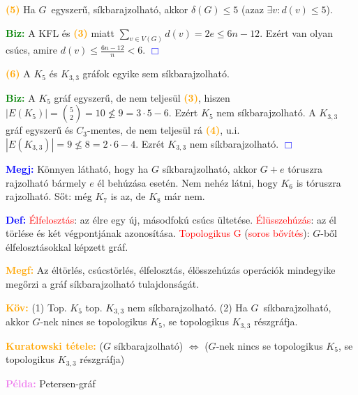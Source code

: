 \documentclass[../../szobeli.tex]{subfiles}
\begin{document}
\begin{itemize}
        \textcolor{orange}{\textbf{(5)}} Ha $G$ egyszerű, síkbarajzolható, akkor $\delta(G) \leq 5$ (azaz $\exists v : d(v) \leq 5$).

        \textcolor{green}{\textbf{Biz:}} A KFL és \textcolor{orange}{\textbf{(3)}} miatt $\sum_{v\in V(G)}d(v) = 2e \leq 6n - 12$. Ezért van olyan csúcs, amire $d(v) \leq \frac{6n-12}{n} < 6$. \textcolor{blue}{$\Box$}

        \textcolor{orange}{\textbf{(6)}} A $K_5$ és $K_{3,3}$ gráfok egyike sem síkbarajzolható.

        \textcolor{green}{\textbf{Biz:}} A $K_5$ gráf egyszerű, de nem teljesül \textcolor{orange}{\textbf{(3)}}, hiszen $|E(K_5)| = \binom{5}{2} = 10 \nleq 9 = 3 \cdot 5 - 6$. Ezért $K_5$ nem síkbarajzolható. A $K_{3,3}$ gráf egyszerű és $C_3$-mentes, de nem teljesül rá \textcolor{orange}{\textbf{(4)}}, u.i. $|E(K_{3,3})| = 9 \nleq 8 = 2 \cdot 6 - 4$. Ezrét $K_{3,3}$ nem síkbarajzolható. \textcolor{blue}{$\Box$}

        \textcolor{blue}{\textbf{Megj:}} Könnyen látható, hogy ha $G$ síkbarajzolható, akkor $G + e$ tóruszra rajzolható bármely $e$ él behúzása esetén. Nem nehéz látni, hogy $K_6$ is tóruszra rajzolható. Sőt: még $K_7$ is az, de $K_8$ már nem. 

        \textcolor{blue}{\textbf{Def:}} \textcolor{red}{Élfelosztás}: az élre egy új, másodfokú csúcs ültetése. \textcolor{red}{Élüsszehúzás}: az él törlése és két végpontjának azonosítása. \textcolor{red}{Topologikus G} (\textcolor{red}{soros bővítés}): $G$-ből élfelosztásokkal képzett gráf. 

        \textcolor{orange}{\textbf{Megf:}} Az éltörlés, csúcstörlés, élfelosztás, élösszehúzás operációk mindegyike megőrzi a gráf síkbarajzolható tulajdonságát. 

        \textcolor{orange}{\textbf{Köv:}} (1) Top. $K_5$ top. $K_{3,3}$ nem síkbarajzolható. (2) Ha $G$ síkbarajzolható, akkor $G$-nek nincs se topologikus $K_5$, se topologikus $K_{3,3}$ részgráfja.

        \textcolor{orange}{\textbf{Kuratowski tétele:}} ($G$ síkbarajzolható) $\Longleftrightarrow$ ($G$-nek nincs se topologikus $K_5$, se topologikus $K_{3,3}$ részgráfja) 
        
        \textcolor{violet}{\textbf{Példa:}} Petersen-gráf

    \end{itemize}
\end{document}

